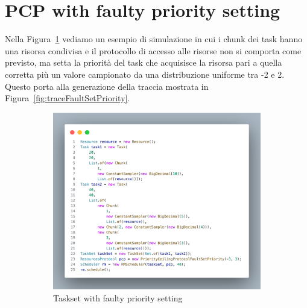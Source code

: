 \section{PCP with faulty priority setting}
Nella Figura~\ref{fig:tasksetFaultSetPriority} vediamo un esempio di simulazione in cui i chunk dei task hanno una risorsa condivisa e il protocollo di accesso alle risorse non si comporta come previsto, ma setta la priorità del task che acquisisce la risorsa pari a quella corretta più un valore campionato da una distribuzione uniforme tra -2 e 2. Questo porta alla generazione della traccia mostrata in Figura~\ref{fig:traceFaultSetPriority}.

\begin{figure}[htbp]
    \centering
    \begin{subfigure}{.4\textwidth}
        \vfill
        \centering
        \includegraphics[width=.9\textwidth]{immagini/taskset fault set priority.pdf}
        \caption{Taskset with faulty priority setting}
        \label{fig:tasksetFaultSetPriority}
        \vfill
    \end{subfigure}
    \hfill
    \begin{subfigure}{0.4\textwidth}
        \vfill
        \centering
\end{subfigure}
\end{figure}
